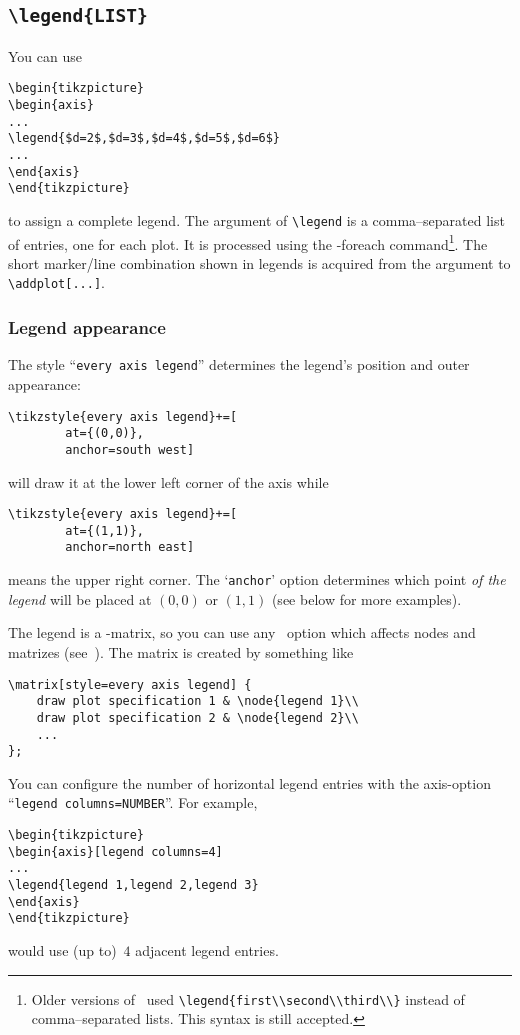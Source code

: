 \subsection{\texttt{\textbackslash legend\{LIST\}}}
\label{sec:legenddef}%
You can use
\begin{lstlisting}
\begin{tikzpicture}
\begin{axis}
...
\legend{$d=2$,$d=3$,$d=4$,$d=5$,$d=6$}
...
\end{axis}
\end{tikzpicture}
\end{lstlisting}
to assign a complete legend. The argument of \lstinline[breaklines=false]!\legend! is a comma--separated list of entries, one for each plot. It is processed using the \PGF-foreach command\footnote{Older versions of \PGFPlots\ used \texttt{\textbackslash legend\{first\textbackslash\textbackslash second\textbackslash\textbackslash third\textbackslash\textbackslash\}} instead of comma--separated lists. This syntax is still accepted.}.
The short marker/line combination shown in legends is acquired from the argument to \lstinline[breaklines=false]!\addplot[...]!.

\subsubsection{Legend appearance}
The style ``\texttt{every axis legend}'' determines the legend's position and outer appearance:
\begin{lstlisting}
\tikzstyle{every axis legend}+=[
		at={(0,0)},
		anchor=south west]
\end{lstlisting}
will draw it at the lower left corner of the axis while
\begin{lstlisting}
\tikzstyle{every axis legend}+=[
		at={(1,1)},
		anchor=north east]
\end{lstlisting}
means the upper right corner. The `\texttt{anchor}' option determines which point \emph{of the legend} will be placed at $(0,0)$ or $(1,1)$ (see below for more examples).

The legend is a \Tikz-matrix, so you can use any \Tikz\ option which affects
nodes and matrizes (see~\cite[section 13~and~14]{tikz}). The matrix is created by something like
\begin{lstlisting}
\matrix[style=every axis legend] {
	draw plot specification 1 & \node{legend 1}\\
	draw plot specification 2 & \node{legend 2}\\
	...
};
\end{lstlisting}
You can configure the number of horizontal legend entries with the axis-option ``\texttt{legend columns=NUMBER}''. For example,
\begin{lstlisting}
\begin{tikzpicture}
\begin{axis}[legend columns=4]
...
\legend{legend 1,legend 2,legend 3}
\end{axis}
\end{tikzpicture}
\end{lstlisting}
would use (up to)~$4$ adjacent legend entries.

